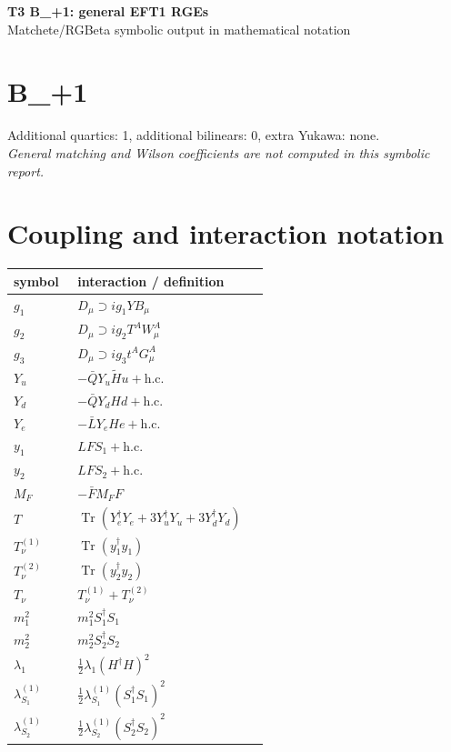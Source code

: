 \documentclass[10pt,a4paper]{article}
\begin{document}
\begin{center}
{\Large\bfseries T3 B\_+1: general EFT1 RGEs}\\[4pt]
Matchete/RGBeta symbolic output in mathematical notation
\end{center}
\bigskip
\section*{B\_+1}
Additional quartics: 1, additional bilinears: 0, extra Yukawa: none.\\
\emph{General matching and Wilson coefficients are not computed in this symbolic report.}
\section*{Coupling and interaction notation}
\begin{longtable}{@{}p{0.23\linewidth}p{0.69\linewidth}@{}}
\toprule
symbol & interaction / definition \\
\midrule
$g_1$ & $D_\mu\supset i g_1YB_\mu$ \\
$g_2$ & $D_\mu\supset i g_2T^AW_\mu^A$ \\
$g_3$ & $D_\mu\supset i g_3t^AG_\mu^A$ \\
$Y_u$ & $-\bar QY_u\widetilde Hu+\mathrm{h.c.}$ \\
$Y_d$ & $-\bar QY_dHd+\mathrm{h.c.}$ \\
$Y_e$ & $-\bar LY_eHe+\mathrm{h.c.}$ \\
$y_1$ & $LFS_1+\mathrm{h.c.}$ \\
$y_2$ & $LFS_2+\mathrm{h.c.}$ \\
$M_F$ & $-\bar FM_FF$ \\
$T$ & $\operatorname{Tr}(Y_e^\dagger Y_e+3Y_u^\dagger Y_u+3Y_d^\dagger Y_d)$ \\
$T_\nu^{(1)}$ & $\operatorname{Tr}(y_1^\dagger y_1)$ \\
$T_\nu^{(2)}$ & $\operatorname{Tr}(y_2^\dagger y_2)$ \\
$T_\nu$ & $T_\nu^{(1)}+T_\nu^{(2)}$ \\
$m_1^2$ & $m_1^2S_1^\dagger S_1$ \\
$m_2^2$ & $m_2^2S_2^\dagger S_2$ \\
$\lambda_1$ & $\frac12\lambda_1(H^\dagger H)^2$ \\
$\lambda_{S_1}^{(1)}$ & $\frac12\lambda_{S_1}^{(1)}(S_1^\dagger S_1)^2$ \\
$\lambda_{S_2}^{(1)}$ & $\frac12\lambda_{S_2}^{(1)}(S_2^\dagger S_2)^2$ \\

\end{longtable}
\end{document}
